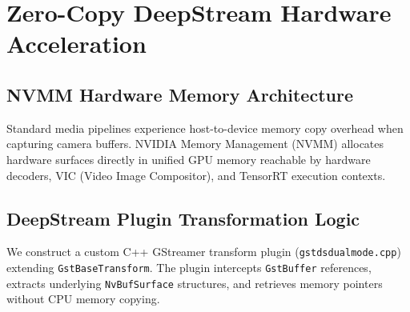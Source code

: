 \documentclass[10pt,journal,compsoc]{IEEEtran}
\begin{document}
\section{Zero-Copy DeepStream Hardware Acceleration}

\subsection{NVMM Hardware Memory Architecture}
Standard media pipelines experience host-to-device memory copy overhead when capturing camera buffers. NVIDIA Memory Management (NVMM) allocates hardware surfaces directly in unified GPU memory reachable by hardware decoders, VIC (Video Image Compositor), and TensorRT execution contexts.

\subsection{DeepStream Plugin Transformation Logic}
We construct a custom C++ GStreamer transform plugin (\texttt{gstdsdualmode.cpp}) extending \texttt{GstBaseTransform}. The plugin intercepts \texttt{GstBuffer} references, extracts underlying \texttt{NvBufSurface} structures, and retrieves memory pointers without CPU memory copying.
\end{document}

